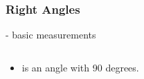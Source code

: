 \begin{module}[id=right-angle]
\begin{frame}
  \frametitle{Right Angles}
  - basic measurements\\
  \begin{columns}
    \begin{column}{7.8cm}
      \begin{itemize}
      \item
      \begin{definition}
         is an angle with 90 degrees.
      \end{definition}
    \end{itemize}
    \end{column}
    \begin{column}{3.5cm}
    \end{column}
  \end{columns}
\end{frame}
\end{module}
